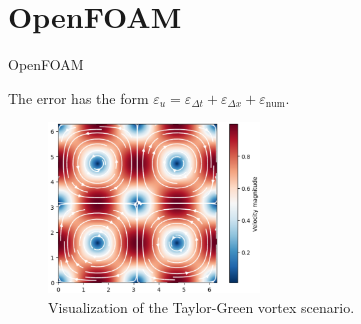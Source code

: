 \documentclass[
  english,            %
  aspectratio=43,    %
]{tumbeamer}
\begin{document}
\section{OpenFOAM}
\begin{frame}{OpenFOAM}
\vspace{10pt}

The error has the form $\varepsilon_u = \varepsilon_{\Delta t} + \varepsilon_{\Delta x} + \varepsilon_\text{num}$.
\vspace{10pt}

\vspace*{\fill}

    \begin{figure}
        \centering
        \includegraphics[width=0.5\textwidth]{resources/taylor-green-vortex.png}
        \caption{Visualization of the Taylor-Green vortex scenario.}
    \end{figure}
\end{frame}
\end{document}
